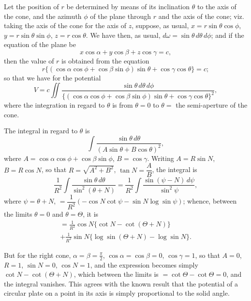 \documentclass[11pt,a4paper]{book}
\begin{document}
\begin{art}
Let the position of $r$ be determined by means of its inclination $\theta$ to the axis of the cone, and the azimuth $\phi$ of the plane through $r$ and the axis of the cone; viz. taking the axis of the cone for the axis of $z$, suppose, as usual, $x = r\sin\theta\cos\phi$, $y = r\sin\theta\sin\phi$, $z = r\cos\theta$. We have then, as usual, $d\omega = \sin\theta\,d\theta\,d\phi$; and if the equation of the plane be
\[ x\cos\alpha + y\cos\beta + z\cos\gamma = c, \]
then the value of $r$ is obtained from the equation
\[ r\{(\cos\alpha\cos\phi + \cos\beta\sin\phi)\sin\theta + \cos\gamma\cos\theta\} = c; \]
so that we have for the potential
\[
V = c\iint \frac{\sin\theta\,d\theta\,d\phi}{\{(\cos\alpha\cos\phi + \cos\beta\sin\phi)\sin\theta + \cos\gamma\cos\theta\}^2},
\]
where the integration in regard to $\theta$ is from $\theta = 0$ to $\theta = $ the semi-aperture of the cone.
\end{art}

\begin{art}
The integral in regard to $\theta$ is
\[
\int \frac{\sin\theta\,d\theta}{(A\sin\theta + B\cos\theta)^2},
\]
where $A = \cos\alpha\cos\phi + \cos\beta\sin\phi$, $B = \cos\gamma$. Writing $A = R\sin N$, $B = R\cos N$, so that $R = \sqrt{A^2 + B^2}$, $\tan N = \dfrac{A}{B}$, the integral is
\[
\frac{1}{R^2}\int \frac{\sin\theta\,d\theta}{\sin^2(\theta + N)} = \frac{1}{R^2}\int \frac{\sin(\psi - N)\,d\psi}{\sin^2\psi},
\]
where $\psi = \theta + N$, $= \dfrac{1}{R^2}(-\cos N\cot\psi - \sin N\log\sin\psi)$; whence, between the limits $\theta = 0$ and $\theta = \Theta$, it is
\begin{multline*}
= \frac{1}{R^2}\cos N\{\cot N - \cot(\Theta + N)\} \\
+ \frac{1}{R^2}\sin N\{\log\sin(\Theta + N) - \log\sin N\}.
\end{multline*}
\end{art}

\begin{art}
But for the right cone, $\alpha = \beta = \frac{\pi}{2}$, $\cos\alpha = \cos\beta = 0$, $\cos\gamma = 1$, so that $A = 0$, $R = 1$, $\sin N = 0$, $\cos N = 1$, and the expression becomes simply $\cot N - \cot(\Theta + N)$, which between the limits is $= \cot\Theta - \cot\Theta = 0$, and the integral vanishes. This agrees with the known result that the potential of a circular plate on a point in its axis is simply proportional to the solid angle.
\end{art}
\end{document}
